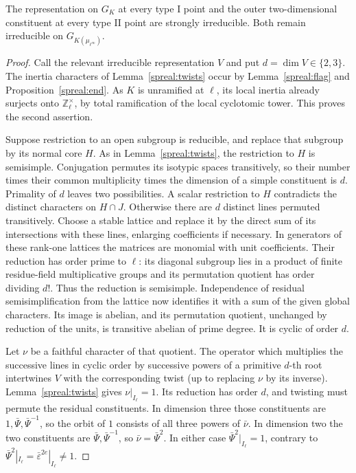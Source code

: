 \begin{proposition}\label{spreal:strong}
The representation on \(G_K\) at every type I point and the outer
two-dimensional constituent at every type II point are strongly
irreducible. Both remain irreducible on \(G_{K(\mu_{\ell^\infty})}\).
\end{proposition}
\begin{proof}
Call the relevant irreducible representation \(V\) and put
\(d=\dim V\in\{2,3\}\). The inertia characters of
Lemma~\ref{spreal:twists} occur by Lemma~\ref{spreal:flag} and
Proposition~\ref{spreal:end}. As \(K\) is unramified at \(\ell\),
its local inertia already surjects onto \(\mathbb Z_\ell^\times\),
by total ramification of the local cyclotomic tower. This proves
the second assertion.

Suppose restriction to an open subgroup is reducible, and replace
that subgroup by its normal core \(H\). As in Lemma~\ref{spreal:twists},
the restriction to \(H\) is semisimple. Conjugation permutes its
isotypic spaces transitively, so their number times their common
multiplicity times the dimension of a simple constituent is \(d\).
Primality of \(d\) leaves two possibilities. A scalar restriction
to \(H\) contradicts the distinct characters on \(H\cap J\).
Otherwise there are \(d\) distinct lines permuted transitively.
Choose a stable lattice and replace it by the direct sum of its
intersections with these lines, enlarging coefficients if necessary.
In generators of these rank-one lattices the matrices are monomial
with unit coefficients. Their reduction has order prime to \(\ell\):
its diagonal subgroup lies in a product of finite residue-field
multiplicative groups and its permutation quotient has order
dividing \(d!\). Thus the reduction is semisimple. Independence of
residual semisimplification from the lattice now identifies it with
a sum of the given global characters. Its image is abelian, and
its permutation quotient, unchanged by reduction of the units, is
transitive abelian of prime degree. It is cyclic of order \(d\).

Let \(\nu\) be a faithful character of that quotient. The operator
which multiplies the successive lines in cyclic order by successive
powers of a primitive \(d\)-th root intertwines \(V\) with the
corresponding twist (up to replacing \(\nu\) by its inverse).
Lemma~\ref{spreal:twists} gives \(\nu|_{I_\ell}=1\). Its reduction
has order \(d\), and twisting must permute the residual constituents.
In dimension three those constituents are
\(1,\bar\Psi,\bar\Psi^{-1}\), so the orbit of \(1\) consists of all
three powers of \(\bar\nu\). In dimension two the two constituents
are \(\bar\Psi,\bar\Psi^{-1}\), so \(\bar\nu=\bar\Psi^2\).
In either case \(\bar\Psi^2|_{I_\ell}=1\), contrary to
\(\bar\Psi^2|_{I_\ell}=\bar\varepsilon^{2e}|_{I_\ell}\ne1\).
\end{proof}

